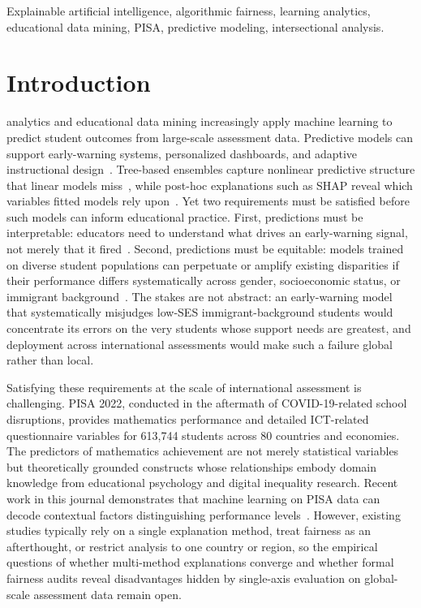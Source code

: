 \documentclass[journal]{IEEEtran}
\begin{document}
\begin{IEEEkeywords}
Explainable artificial intelligence, algorithmic fairness, learning analytics, educational data mining, PISA, predictive modeling, intersectional analysis.
\end{IEEEkeywords}

\section{Introduction}
 analytics and educational data mining increasingly apply machine learning to predict student outcomes from large-scale assessment data. Predictive models can support early-warning systems, personalized dashboards, and adaptive instructional design~\cite{Romero_Ventura_2020}. Tree-based ensembles capture nonlinear predictive structure that linear models miss~\cite{Breiman_2001,Chen_Guestrin_2016}, while post-hoc explanations such as SHAP reveal which variables fitted models rely upon~\cite{Lundberg_Lee_2017}. Yet two requirements must be satisfied before such models can inform educational practice. First, predictions must be interpretable: educators need to understand what drives an early-warning signal, not merely that it fired~\cite{Rudin_2019,Molnar_2022}. Second, predictions must be equitable: models trained on diverse student populations can perpetuate or amplify existing disparities if their performance differs systematically across gender, socioeconomic status, or immigrant background~\cite{Baker_Hawn_2022,Kizilcec_Lee_2022}. The stakes are not abstract: an early-warning model that systematically misjudges low-SES immigrant-background students would concentrate its errors on the very students whose support needs are greatest, and deployment across international assessments would make such a failure global rather than local.

Satisfying these requirements at the scale of international assessment is challenging. PISA 2022, conducted in the aftermath of COVID-19-related school disruptions, provides mathematics performance and detailed ICT-related questionnaire variables for 613,744 students across 80 countries and economies. The predictors of mathematics achievement are not merely statistical variables but theoretically grounded constructs whose relationships embody domain knowledge from educational psychology and digital inequality research. Recent work in this journal demonstrates that machine learning on PISA data can decode contextual factors distinguishing performance levels~\cite{hu2023decoding}. However, existing studies typically rely on a single explanation method, treat fairness as an afterthought, or restrict analysis to one country or region, so the empirical questions of whether multi-method explanations converge and whether formal fairness audits reveal disadvantages hidden by single-axis evaluation on global-scale assessment data remain open.
\end{document}
